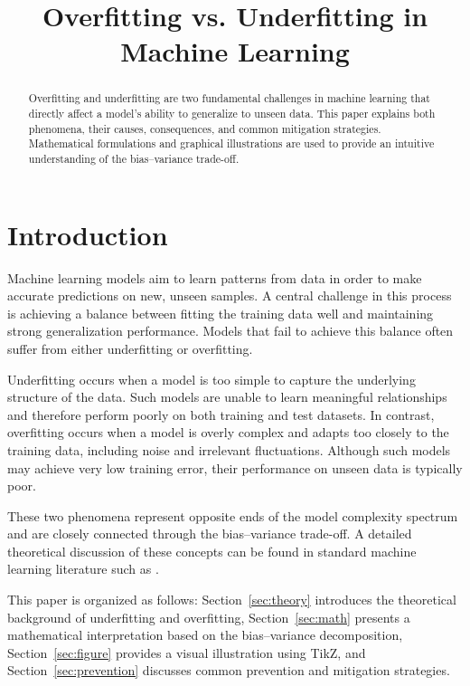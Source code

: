 \documentclass{article}
\title{Overfitting vs. Underfitting in Machine Learning}
\begin{document}
\maketitle

\begin{abstract}
Overfitting and underfitting are two fundamental challenges in machine learning
that directly affect a model's ability to generalize to unseen data. This paper
explains both phenomena, their causes, consequences, and common mitigation
strategies. Mathematical formulations and graphical illustrations are used to
provide an intuitive understanding of the bias--variance trade-off.
\end{abstract}

\section{Introduction}
\label{sec:introduction}

Machine learning models aim to learn patterns from data in order to make accurate
predictions on new, unseen samples. A central challenge in this process is
achieving a balance between fitting the training data well and maintaining strong
generalization performance. Models that fail to achieve this balance often suffer
from either underfitting or overfitting.

Underfitting occurs when a model is too simple to capture the underlying structure
of the data. Such models are unable to learn meaningful relationships and therefore
perform poorly on both training and test datasets. In contrast, overfitting occurs
when a model is overly complex and adapts too closely to the training data,
including noise and irrelevant fluctuations. Although such models may achieve
very low training error, their performance on unseen data is typically poor.

These two phenomena represent opposite ends of the model complexity spectrum and
are closely connected through the bias--variance trade-off. A detailed theoretical
discussion of these concepts can be found in standard machine learning literature
such as \cite{bishop2006}.

This paper is organized as follows: Section~\ref{sec:theory} introduces the
theoretical background of underfitting and overfitting, Section~\ref{sec:math}
presents a mathematical interpretation based on the bias--variance decomposition,
Section~\ref{sec:figure} provides a visual illustration using TikZ, and
Section~\ref{sec:prevention} discusses common prevention and mitigation strategies.
\end{document}
